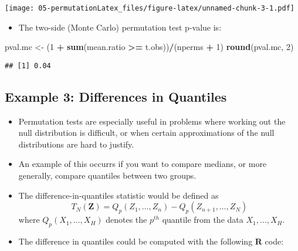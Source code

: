 \documentclass[]{book}
\newenvironment{Shaded}{\begin{snugshade}}{\end{snugshade}}
\newcommand{\DecValTok}[1]{\textcolor[rgb]{0.00,0.00,0.81}{#1}}
\newcommand{\KeywordTok}[1]{\textcolor[rgb]{0.13,0.29,0.53}{\textbf{#1}}}
\newcommand{\NormalTok}[1]{#1}
\newcommand{\OperatorTok}[1]{\textcolor[rgb]{0.81,0.36,0.00}{\textbf{#1}}}
\newcommand{\StringTok}[1]{\textcolor[rgb]{0.31,0.60,0.02}{#1}}
\providecommand{\tightlist}{%
  \setlength{\itemsep}{0pt}\setlength{\parskip}{0pt}}
\begin{document}
\texttt{[image: 05-permutationLatex\_files/figure-latex/unnamed-chunk-3-1.pdf]}

\begin{itemize}
\tightlist
\item
  The two-side (Monte Carlo) permutation test p-value is:
\end{itemize}

\begin{Shaded}
\begin{Highlighting}[]
\NormalTok{pval.mc <-}\StringTok{ }\NormalTok{(}\DecValTok{1} \OperatorTok{+}\StringTok{ }\KeywordTok{sum}\NormalTok{(mean.ratio }\OperatorTok{>=}\StringTok{ }\NormalTok{t.obs))}\OperatorTok{/}\NormalTok{(nperms }\OperatorTok{+}\StringTok{ }\DecValTok{1}\NormalTok{)}
\KeywordTok{round}\NormalTok{(pval.mc, }\DecValTok{2}\NormalTok{)}
\end{Highlighting}
\end{Shaded}

\begin{verbatim}
## [1] 0.04
\end{verbatim}

\hypertarget{example-3-differences-in-quantiles}{%
\subsection{Example 3: Differences in Quantiles}\label{example-3-differences-in-quantiles}}

\begin{itemize}
\item
  Permutation tests are especially useful in problems where working out the null distribution
  is difficult, or when certain approximations of the null distributions are hard to justify.
\item
  An example of this occurrs if you want to compare medians, or more generally,
  compare quantiles between two groups.
\item
  The difference-in-quantiles statistic would be defined as
  \begin{equation}
  T_{N}( \mathbf{Z} ) = Q_{p}(Z_{1}, \ldots, Z_{n}) - Q_{p}(Z_{n+1}, \ldots, Z_{N}) \nonumber
  \end{equation}
  where \(Q_{p}(X_{1}, \ldots, X_{H})\) denotes the \(p^{th}\) quantile from the data \(X_{1}, \ldots, X_{H}\).
\item
  The difference in quantiles could be computed with the following \textbf{R} code:
\end{itemize}
\end{document}

